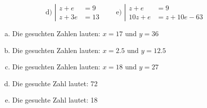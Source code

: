\begin{exercise}
    \begin{equation*}
      \text{d)~}
      \left|
      \begin{split}
        z+e&=\num{9}\\
        z+3e&=\num{13}
      \end{split}
      \right.
      \qquad
      \text{e)~}
      \left|
      \begin{split}
        z+e&=\num{9}\\
        10z+e&=z+10e-\num{63}
      \end{split}
      \right.
    \end{equation*}
  \fi
  \ifoutcome\outcome\par
    \begin{enumerate}[a)]
      \item Die gesuchten Zahlen lauten: $x=\num{17}$ und $y=\num{36}$
      \item Die gesuchten Zahlen lauten: $x=\num{2.5}$ und $y=\num{12.5}$
      \item Die gesuchten Zahlen lauten: $x=\num{18}$ und $y=\num{27}$
      \item Die gesuchte Zahl lautet: \num{72}
      \item Die gesuchte Zahl lautet: \num{18}
    \end{enumerate}
  \fi
\end{exercise}
